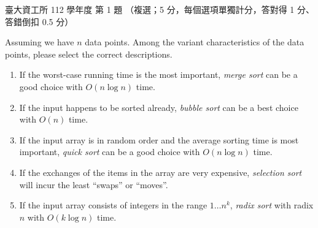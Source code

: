 \begin{pastexam}[label={px:ntu-112-dsa-01}]{臺大資工所 112 學年度 第 1 題}
（複選；5 分，每個選項單獨計分，答對得 1 分、答錯倒扣 0.5 分）

Assuming we have $n$ data points. Among the variant characteristics of the data points, please
select the correct descriptions.
\begin{enumerate}[label=(\Alph*)]
\item If the worst-case running time is the most important, \textit{merge sort} can be a good choice with
$O(n\log n)$ time.
\item If the input happens to be sorted already, \textit{bubble sort} can be a best choice with $O(n)$ time.
\item If the input array is in random order and the average sorting time is most important, \textit{quick
sort} can be a good choice with $O(n\log n)$ time.
\item If the exchanges of the items in the array are very expensive, \textit{selection sort} will incur the
least ``swaps'' or ``moves''.
\item If the input array consists of integers in the range $1\ldots n^k$, \textit{radix sort} with radix $n$
with $O(k\log n)$ time.
\end{enumerate}
\end{pastexam}

